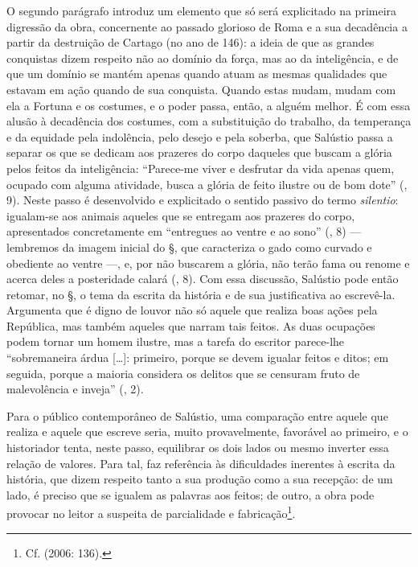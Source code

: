 O segundo parágrafo introduz um elemento que só será explicitado na primeira
digressão da obra, concernente ao passado glorioso de Roma e a sua decadência a
partir da destruição de Cartago (no ano de 146): a ideia de que as grandes conquistas
dizem respeito não ao domínio da força, mas ao da inteligência, e de que um
domínio se mantém apenas quando atuam as mesmas qualidades que estavam em ação
quando de sua conquista. Quando estas mudam, mudam com ela a Fortuna e os
costumes, e o poder passa, então, a alguém melhor. 
É com essa alusão à decadência dos costumes, com a substituição do
trabalho, da temperança e da equidade pela indolência, pelo desejo e pela
soberba, que Salústio passa a separar os que se dedicam aos prazeres do corpo
daqueles que buscam a glória pelos feitos da inteligência: ``Parece-me viver e
desfrutar da vida apenas quem, ocupado com alguma atividade, busca a glória de
feito ilustre ou de bom dote'' (, 9). Neste passo é desenvolvido e explicitado
o sentido passivo do termo \emph{silentio}: igualam-se aos animais aqueles que
se entregam aos prazeres do corpo, apresentados concretamente em “entregues ao
ventre e ao sono” (, 8) --- lembremos da imagem inicial do §, que caracteriza
o gado como curvado e obediente ao ventre ---, e, por não buscarem a glória,
não terão fama ou renome e acerca deles a posteridade calará (, 8).  Com essa
discussão, Salústio pode então retomar, no §, o tema da escrita da história e
de sua justificativa ao escrevê-la. Argumenta que é digno de louvor não só
aquele que realiza boas ações pela República, mas também aqueles que narram
tais feitos. As duas ocupações podem tornar um homem ilustre, mas a tarefa do
escritor parece-lhe “sobremaneira árdua [\ldots{}]: %
primeiro, porque se devem
igualar feitos e ditos; em seguida, porque a maioria considera os delitos que
se censuram fruto de malevolência e inveja” (, 2). 


Para o público contemporâneo de Salústio, uma comparação entre aquele que
realiza e aquele que escreve seria, muito provavelmente, favorável ao primeiro,
e o historiador tenta, neste passo, equilibrar os dois lados ou mesmo inverter
essa relação de valores. Para tal, faz referência às dificuldades inerentes à
escrita da história, que dizem respeito tanto a sua produção como a sua
recepção: de um lado, é preciso que se igualem as palavras aos feitos; de
outro, a obra pode provocar no leitor a suspeita de parcialidade e
fabricação\footnote{Cf.  (2006: 136).}.


